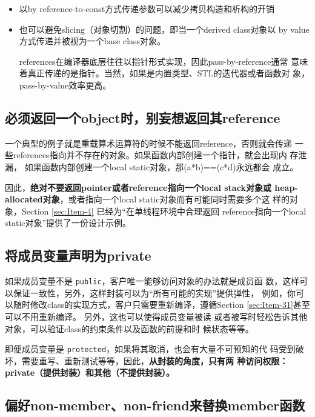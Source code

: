 \documentclass[a4paper,twoside]{article}
\theoremstyle{definition}
\theoremstyle{remark}
\numberwithin{equation}{section}
\let\OldTexttt\texttt
\renewcommand{\texttt}[1]{{\color{blue} \OldTexttt{#1}}}
\begin{document}
\begin{itemize}
\item 以by reference-to-const方式传递参数可以减少拷贝构造和析构的开销
\item 也可以避免slicing（对象切割）的问题，即当一个derived class对象以
  by value方式传递并被视为一个base class对象。

  references在编译器底层往往以指针形式实现，因此pass-by-reference通常
  意味着真正传递的是指针。当然，如果是内置类型、STL的迭代器或者函数对
  象，pass-by-value效率更高。
\end{itemize}

\subsection{必须返回一个object时，别妄想返回其reference}
\label{sec:Item-21}

一个典型的例子就是重载算术运算符的时候不能返回reference，否则就会传递
一些references指向并不存在的对象。如果函数内部创建一个指针，就会出现内
存泄漏， 如果函数内部创建一个local static对象，那(a*b)==(c*d)永远都会
成立。

因此，\textbf{绝对不要返回pointer或者reference指向一个local stack对象或
heap-allocated对象}，或者指向一个local static对象而有可能同时需要多个这
样的对象，Section \ref{sec:Item-4} 已经为“在单线程环境中合理返回
reference指向一个local static对象”提供了一份设计示例。

\subsection{将成员变量声明为private}
\label{sec:Item-22}

如果成员变量不是\texttt{public}，客户唯一能够访问对象的办法就是成员函
数，这样可以保证一致性，另外，这样封装可以为“所有可能的实现”提供弹性，
例如，你可以随时修改class的实现方式，客户只需要重新编译，遵循Section
\ref{sec:Item-31}甚至可以不用重新编译。 另外，这也可以使得成员变量被读
或者被写时轻松告诉其他对象，可以验证class的约束条件以及函数的前提和时
候状态等等。

即便成员变量是\texttt{protected}，如果将其取消，也会有大量不可预知的代
码受到破坏，需要重写、重新测试等等，因此，\textbf{从封装的角度，只有两
  种访问权限：private（提供封装）和其他（不提供封装）。}

\subsection{偏好non-member、non-friend来替换member函数}
\label{sec:Item-23}
\end{document}
